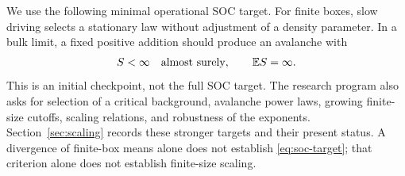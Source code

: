 \documentclass[11pt]{article}
\numberwithin{equation}{section}
\theoremstyle{definition}
\newcommand{\E}{\mathbb E}
\begin{document}
We use the following minimal operational SOC target. For finite boxes, slow driving selects a stationary law without adjustment of a density parameter. In a bulk limit, a fixed positive addition should produce an avalanche with
\begin{equation}\label{eq:soc-target}
 S<\infty\quad\hbox{almost surely},\qquad \E S=\infty.
\end{equation}
This is an initial checkpoint, not the full SOC target. The research program also asks for selection of a critical background, avalanche power laws, growing finite-size cutoffs, scaling relations, and robustness of the exponents. Section~\ref{sec:scaling} records these stronger targets and their present status. A divergence of finite-box means alone does not establish \eqref{eq:soc-target}; that criterion alone does not establish finite-size scaling.
\end{document}
